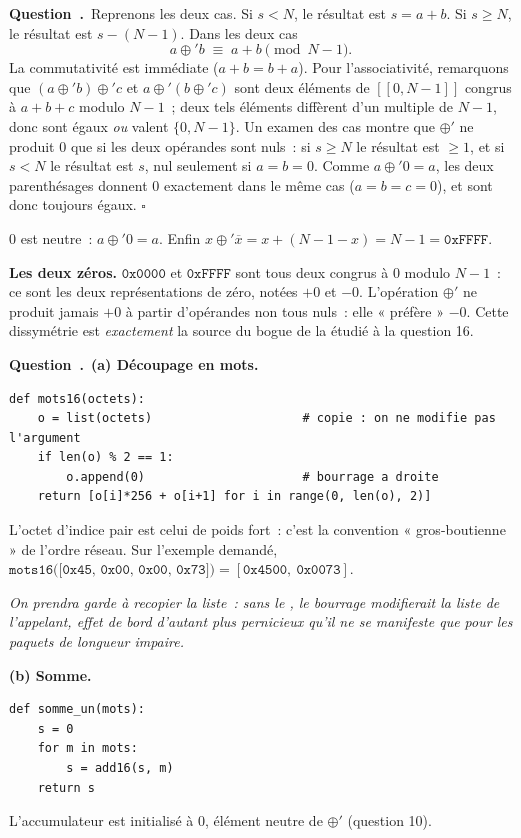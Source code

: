 \documentclass[11pt,a4paper]{article}
\renewcommand{\Q}{\medskip\par\stepcounter{qcnt}\noindent\textbf{\color{cnc}Question~\theqcnt.}~}
\begin{document}
\Q Reprenons les deux cas. Si $s<N$, le résultat est $s=a+b$. Si $s\ge N$, le résultat est
$s-(N-1)$. Dans les deux cas
\[ a\oplus' b \;\equiv\; a+b \pmod{N-1}. \]
La commutativité est immédiate ($a+b=b+a$). Pour l'associativité, remarquons que
$(a\oplus' b)\oplus' c$ et $a\oplus'(b\oplus' c)$ sont deux éléments de $[\![0,N-1]\!]$
congrus à $a+b+c$ modulo $N-1$~; deux tels éléments diffèrent d'un multiple de $N-1$, donc
sont égaux \emph{ou} valent $\{0,N-1\}$. Un examen des cas montre que $\oplus'$ ne produit
$0$ que si les deux opérandes sont nuls~: si $s\ge N$ le résultat est $\ge 1$, et si $s<N$ le
résultat est $s$, nul seulement si $a=b=0$. Comme $a\oplus'0=a$, les deux parenthésages
donnent $0$ exactement dans le même cas ($a=b=c=0$), et sont donc toujours égaux.
\hfill$\square$

$0$ est neutre~: $a\oplus'0=a$. Enfin $x\oplus'\overline{x}=x+(N-1-x)=N-1=\texttt{0xFFFF}$.

\textbf{Les deux zéros.} $\texttt{0x0000}$ et $\texttt{0xFFFF}$ sont tous deux congrus à $0$
modulo $N-1$~: ce sont les deux représentations de zéro, notées $+0$ et $-0$. L'opération
$\oplus'$ ne produit jamais $+0$ à partir d'opérandes non tous nuls~: elle « préfère »
$-0$. Cette dissymétrie est \emph{exactement} la source du bogue de la  étudié à la
question 16.

\Q \textbf{(a) Découpage en mots.}
\begin{lstlisting}
def mots16(octets):
    o = list(octets)                     # copie : on ne modifie pas l'argument
    if len(o) % 2 == 1:
        o.append(0)                      # bourrage a droite
    return [o[i]*256 + o[i+1] for i in range(0, len(o), 2)]
\end{lstlisting}
L'octet d'indice pair est celui de poids fort~: c'est la convention « gros-boutienne » de
l'ordre réseau. Sur l'exemple demandé,
$\texttt{mots16([0x45, 0x00, 0x00, 0x73])} = [\texttt{0x4500},\ \texttt{0x0073}]$.

\emph{On prendra garde à recopier la liste~: sans le , le bourrage
modifierait la liste de l'appelant, effet de bord d'autant plus pernicieux qu'il ne se
manifeste que pour les paquets de longueur impaire.}

\textbf{(b) Somme.}
\begin{lstlisting}
def somme_un(mots):
    s = 0
    for m in mots:
        s = add16(s, m)
    return s
\end{lstlisting}
L'accumulateur est initialisé à $0$, élément neutre de $\oplus'$ (question 10).
\end{document}
